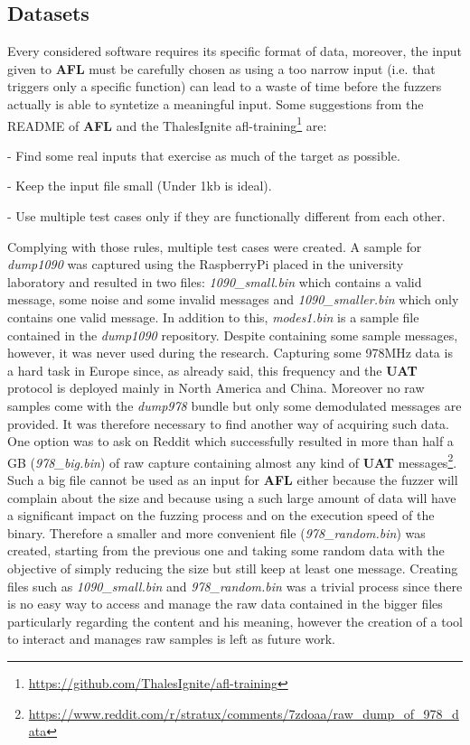 \documentclass[../main.tex]{subfiles}
\begin{document}
\subsection{Datasets}

Every considered software requires its specific format of data, moreover, the
input given to \textbf{AFL} must be carefully chosen as using a too narrow input
(i.e. that triggers only a specific function) can lead to a waste of time before
the fuzzers actually is able to syntetize a meaningful input. Some suggestions
from the README of \textbf{AFL} and the ThalesIgnite
afl-training\footnote{\url{https://github.com/ThalesIgnite/afl-training}} are:

- Find some real inputs that exercise as much of the target as possible.

- Keep the input file small (Under 1kb  is ideal).

- Use multiple test cases only if they are functionally different from each
other.

\bigskip Complying with those rules, multiple test cases were created. A sample
for \textit{dump1090} was captured using the RaspberryPi placed in the
university laboratory and resulted in two files:  \emph{1090\_small.bin} which
contains a valid message, some noise and some invalid messages and
\emph{1090\_smaller.bin} which only contains one valid message. In addition to
this, \emph{modes1.bin} is a sample file contained in the \emph{dump1090}
repository. Despite containing some sample messages, however, it was never used
during the research. Capturing some 978MHz data is a hard task in Europe since,
as already said, this frequency and the \textbf{UAT} protocol is deployed mainly
in North America and China. Moreover no raw samples come with the
\textit{dump978} bundle but only some demodulated messages are provided. It was
therefore necessary to find another way of acquiring such data. One option was
to ask on Reddit which successfully resulted in more than half a GB
(\textit{978\_big.bin}) of raw capture containing almost any kind of
\textbf{UAT}
messages\footnote{\url{https://www.reddit.com/r/stratux/comments/7zdoaa/raw_dump_of_978_data}}.
Such a big file cannot be used as an input for \textbf{AFL} either because the
fuzzer will complain about the size and because using a such large amount of
data will have a significant impact on the fuzzing process and on the execution
speed of the binary. Therefore a smaller and more convenient file
(\textit{978\_random.bin}) was created, starting from the previous one and
taking some random data with the objective of simply reducing the size but still
keep at least one message. Creating files such as \textit{1090\_small.bin} and
\textit{978\_random.bin} was a trivial process since there is no easy way to
access and manage the raw data contained in the bigger files particularly
regarding the content and his meaning, however the creation of a tool to
interact and manages raw samples is left as future work.
\end{document}
